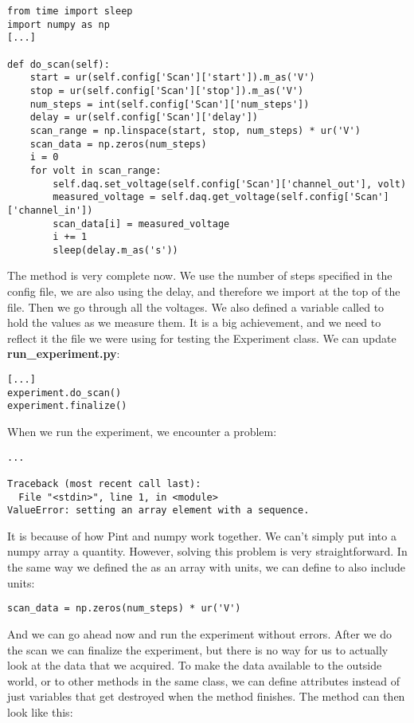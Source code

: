 \begin{verbatim}
from time import sleep
import numpy as np
[...]

def do_scan(self):
    start = ur(self.config['Scan']['start']).m_as('V')
    stop = ur(self.config['Scan']['stop']).m_as('V')
    num_steps = int(self.config['Scan']['num_steps'])
    delay = ur(self.config['Scan']['delay'])
    scan_range = np.linspace(start, stop, num_steps) * ur('V')
    scan_data = np.zeros(num_steps)
    i = 0
    for volt in scan_range:
        self.daq.set_voltage(self.config['Scan']['channel_out'], volt)
        measured_voltage = self.daq.get_voltage(self.config['Scan']['channel_in'])
        scan_data[i] = measured_voltage
        i += 1
        sleep(delay.m_as('s'))
\end{verbatim}

The  method is very complete now. We use the number of steps specified in the config file, we are also using the delay, and therefore we import  at the top of the file. Then we go through all the voltages. We also defined a variable called  to hold the values as we measure them. It is a big achievement, and we need to reflect it the file we were using for testing the Experiment class. We can update \textbf{run\_experiment.py}:

\begin{verbatim}
[...]
experiment.do_scan()
experiment.finalize()
\end{verbatim}

When we run the experiment, we encounter a problem:

\begin{verbatim}
...

Traceback (most recent call last):
  File "<stdin>", line 1, in <module>
ValueError: setting an array element with a sequence.
\end{verbatim}

It is because of how Pint and numpy work together. We can't simply put into a numpy array a quantity. However, solving this problem is very straightforward. In the same way we defined the  as an array with units, we can define  to also include units:

\begin{verbatim}
scan_data = np.zeros(num_steps) * ur('V')
\end{verbatim}

And we can go ahead now and run the experiment without errors. After we do the scan we can finalize the experiment, but there is no way for us to actually look at the data that we acquired. To make the data available to the outside world, or to other methods in the same class, we can define attributes instead of just variables that get destroyed when the method finishes. The  method can then look like this:


